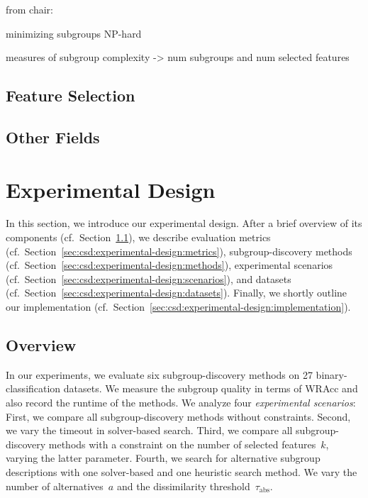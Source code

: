 \documentclass{article}
\theoremstyle{definition}
\begin{document}
from chair: \cite{arzamasov2021reds} \cite{arzamasov2022pedagogical} \cite{vollmer2019informative}

minimizing subgroups NP-hard~\cite{boley2009non}

measures of subgroup complexity \cite{helal2016subgroup, herrera2011overview, ventura2018subgroup} -> num subgroups and num selected features

\subsection{Feature Selection}
\label{sec:csd:related-work:feature-selection}

\cite{bach2022empirical} \cite{bach2023finding}

\subsection{Other Fields}
\label{sec:csd:related-work:other}

\cite{bailey2014alternative} \cite{grossi2017survey}
\cite{guidotti2022counterfactual}
\cite{narodytska2018learning} \cite{schidler2021sat} \cite{yu2021learning}

\section{Experimental Design}
\label{sec:csd:experimental-design}

In this section, we introduce our experimental design.
After a brief overview of its components (cf.~Section~\ref{sec:csd:experimental-design:overview}), we describe evaluation metrics (cf.~Section~\ref{sec:csd:experimental-design:metrics}), subgroup-discovery methods (cf.~Section~\ref{sec:csd:experimental-design:methods}), experimental scenarios (cf.~Section~\ref{sec:csd:experimental-design:scenarios}), and datasets (cf.~Section~\ref{sec:csd:experimental-design:datasets}).
Finally, we shortly outline our implementation (cf.~Section~\ref{sec:csd:experimental-design:implementation}).

\subsection{Overview}
\label{sec:csd:experimental-design:overview}

In our experiments, we evaluate six subgroup-discovery methods on 27 binary-classification datasets.
We measure the subgroup quality in terms of WRAcc and also record the runtime of the methods.
We analyze four \emph{experimental scenarios}:
First, we compare all subgroup-discovery methods without constraints.
Second, we vary the timeout in solver-based search.
Third, we compare all subgroup-discovery methods with a constraint on the number of selected features~$k$, varying the latter parameter.
Fourth, we search for alternative subgroup descriptions with one solver-based and one heuristic search method.
We vary the number of alternatives~$a$ and the dissimilarity threshold~$\tau_{\text{abs}}$.
\end{document}
